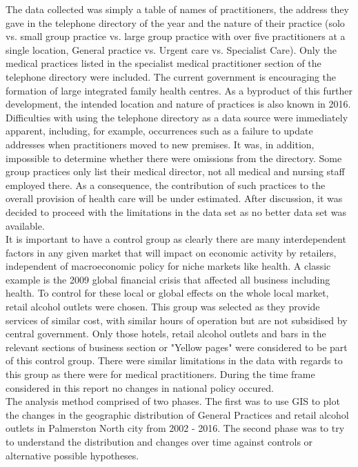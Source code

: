 \documentclass[11pt,a4paper]{article}
\begin{document}
The data collected was simply a table of names of practitioners, the address they gave in the telephone directory of the year and the nature of their practice (solo vs. small group practice vs. large group practice with over five practitioners at a single location,  General practice vs. Urgent care vs. Specialist Care). Only the  medical practices listed in the specialist medical practitioner section of the telephone directory were included. The current government is encouraging the formation of large integrated family health centres. As a byproduct of this further development, the intended location and nature of practices is also known in 2016.\\

Difficulties with using the telephone directory as a data source were immediately apparent, including, for example, occurrences such as a failure to update addresses when practitioners moved to new premises. It was, in addition,  impossible to determine whether there were omissions from the directory. Some group practices only list their medical director, not all medical and nursing staff employed there. As a consequence, the contribution of such practices to the overall provision of health care will be under estimated.  After discussion, it was decided to proceed with the limitations in the data set as no better data set was available.  \\

It is important to have a control group as clearly there are many interdependent factors in any given market that will impact on economic activity by retailers, independent of macroeconomic policy for niche markets like health. A classic example is the 2009 global financial crisis that affected all business including health. To control for these local or global effects on the whole local market, retail alcohol outlets were chosen.  This group was selected as they provide services of similar cost, with similar hours of operation but are not subsidised by central government. Only those hotels, retail alcohol outlets and bars in the relevant sections of business section or "Yellow pages" were considered to be part of this control group. There were similar limitations in the data with regards to this group as there were for medical practitioners. During the time frame considered in this report no changes in national policy occured.\\

The analysis method comprised of two phases. The first was to use GIS to plot the changes in the geographic distribution of General Practices and retail alcohol outlets in Palmerston North city from 2002 - 2016. The second phase was to try to understand the distribution and changes over time against controls or alternative possible hypotheses. \\
\end{document}
